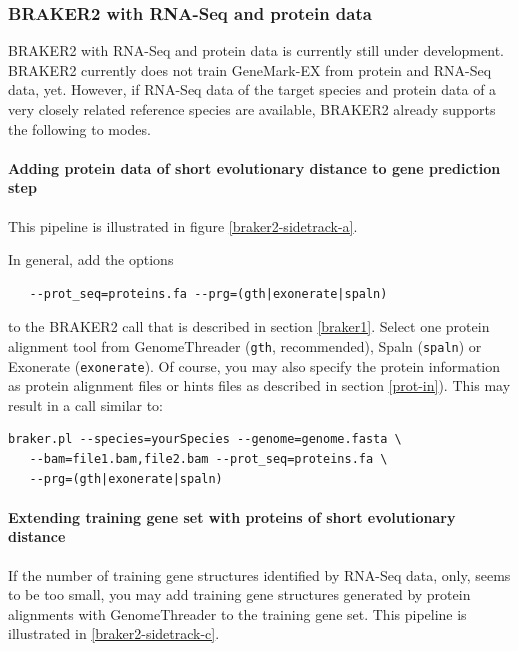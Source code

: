 \documentclass[]{article}
\let\oldparagraph\paragraph
\renewcommand{\paragraph}[1]{\oldparagraph{#1}\mbox{}}
\begin{document}
\subsubsection{BRAKER2 with RNA-Seq and protein data}\label{braker2-with-rna-seq-and-protein-data}

BRAKER2 with RNA-Seq and protein data is currently still under
development. BRAKER2 currently does not train GeneMark-EX from protein
and RNA-Seq data, yet. However, if RNA-Seq data of the target species
and protein data of a very closely related reference species are
available, BRAKER2 already supports the following to modes.

\paragraph{Adding protein data of short evolutionary distance to gene
prediction
step}\label{adding-protein-data-of-short-evolutionary-distance-to-gene-prediction-step}

This pipeline is illustrated in figure \ref{braker2-sidetrack-a}.

In general, add the options

\begin{verbatim}
   --prot_seq=proteins.fa --prg=(gth|exonerate|spaln)
\end{verbatim}

to the BRAKER2 call that is described in section \ref{braker1}. Select
one protein alignment tool from GenomeThreader (\texttt{gth},
recommended), Spaln (\texttt{spaln}) or Exonerate (\texttt{exonerate}).
Of course, you may also specify the protein information as protein
alignment files or hints files as described in section \ref{prot-in}).
This may result in a call similar to:

\begin{verbatim}
braker.pl --species=yourSpecies --genome=genome.fasta \
   --bam=file1.bam,file2.bam --prot_seq=proteins.fa \
   --prg=(gth|exonerate|spaln)
\end{verbatim}

\paragraph{Extending training gene set with proteins of short
evolutionary
distance}\label{extending-training-gene-set-with-proteins-of-short-evolutionary-distance}

If the number of training gene structures identified by RNA-Seq data,
only, seems to be too small, you may add training gene structures
generated by protein alignments with GenomeThreader to the training gene
set. This pipeline is illustrated in \ref{braker2-sidetrack-c}.
\end{document}
